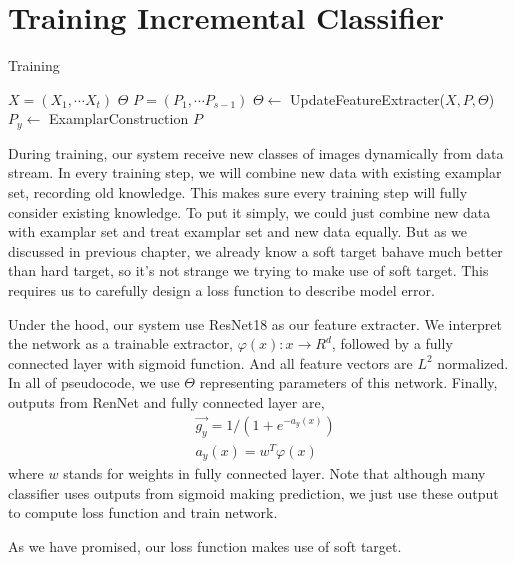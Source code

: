 \documentclass[12pt]{report}
\begin{document}
\section{Training Incremental Classifier}
\begin{algorithm}
	\caption{Training}
    \begin{algorithmic}[1]
        \REQUIRE $X = \left( X_{1},\cdots X_{t} \right)$
        \REQUIRE $\Theta$
        \REQUIRE $P = \left(P_{1},\cdots P_{s-1} \right)$
        \STATE $\Theta \leftarrow$ UpdateFeatureExtracter($X,P,\Theta$)
        \STATE $P_{y} \leftarrow$ ExamplarConstruction
        \ENDFOR
        \ENSURE $P$
	\end{algorithmic}
\end{algorithm}
\par During training, our system receive new classes of images dynamically from data stream. In every training step, we will combine new data with existing examplar set, recording old knowledge. This makes sure every training step will fully consider existing knowledge. To put it simply, we could just combine new data with examplar set and treat examplar set and new data equally. But as we discussed in previous chapter, we already know a soft target bahave much better than hard target, so it's not strange we trying to make use of soft target. This requires us to carefully design a loss function to describe model error.
\par Under the hood, our system use ResNet18 as our feature extracter. We interpret the network as a trainable extractor, $\varphi \left( x \right): x \rightarrow R^{d}$, followed by a fully connected layer with sigmoid function. And all feature vectors are $L^{2}$ normalized. In all of pseudocode, we use $\Theta$ representing parameters of this network. Finally, outputs from RenNet and fully connected layer are,
\begin{equation}
	\begin{split}
		& \vec{g_{y}} = 1 / \left( 1 + e^{-a_{y} \left( x \right)}\right) \\
		& a_{y} \left( x \right) = w^{T} \varphi \left( x \right)
	\end{split}
\end{equation}
where $w$ stands for weights in fully connected layer. Note that although many classifier uses outputs from sigmoid making prediction, we just use these output to compute loss function and train network.
\par As we have promised, our loss function makes use of soft target.
\end{document}
